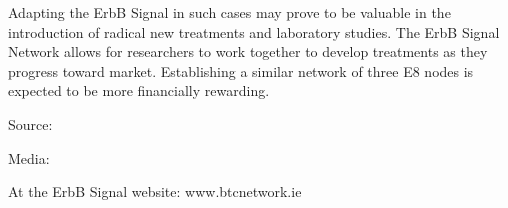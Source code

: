 \documentclass{article}
\begin{document}
Adapting the ErbB Signal in such cases may prove to be valuable in the introduction of radical new treatments and laboratory studies. The ErbB Signal Network allows for researchers to work together to develop treatments as they progress toward market. Establishing a similar network of three E8 nodes is expected to be more financially rewarding.

Source:

Media:

At the ErbB Signal website: www.btcnetwork.ie
\end{document}
